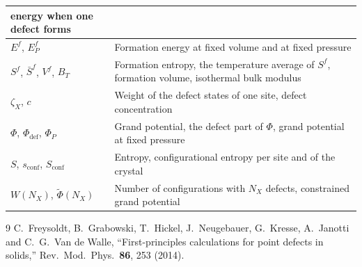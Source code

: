\documentclass[11pt]{article}      %
\numberwithin{equation}{section}   %
\begin{document}
\begin{table}[H]
\begin{tabular}{|>{\raggedright\arraybackslash}p{}
                |>{\raggedright\arraybackslash}p{}|}
energy when one defect forms \\ \hline
$E^f$, $E^f_P$ & Formation energy at fixed volume and at fixed pressure \\ \hline
$S^f$, $\bar S^f$, $V^f$, $B_T$ & Formation entropy, the temperature
average of $S^f$, formation volume, isothermal bulk modulus \\ \hline
$\zeta_X$, $c$ & Weight of the defect states of one site, defect
concentration \\ \hline
$\Phi$, $\Phi_{\text{def}}$, $\Phi_P$ & Grand potential, the defect part of
$\Phi$, grand potential at fixed pressure \\ \hline
$S$, $s_{\text{conf}}$, $S_{\text{conf}}$ & Entropy, configurational
entropy per site and of the crystal \\ \hline
$W(N_X)$, $\widetilde{\Phi}(N_X)$ & Number of configurations with $N_X$
defects, constrained grand potential \\ \hline
\end{tabular}
\end{table}

\begin{thebibliography}{9}
C.~Freysoldt, B.~Grabowski, T.~Hickel, J.~Neugebauer, G.~Kresse,
A.~Janotti and C.~G.~Van de Walle, ``First-principles calculations for
point defects in solids,'' Rev.\ Mod.\ Phys.\ \textbf{86}, 253 (2014).
\end{thebibliography}
\end{document}
